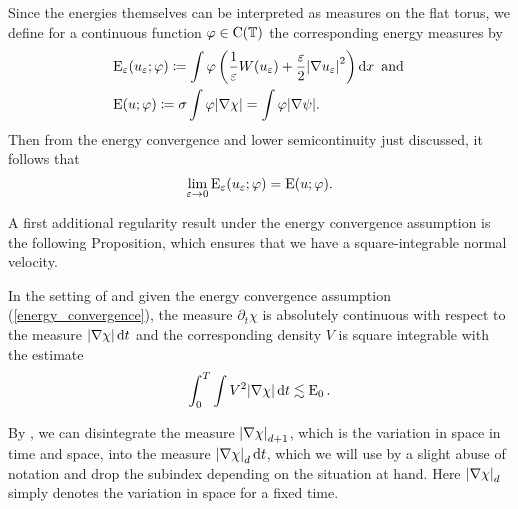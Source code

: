 Since the energies themselves can be interpreted as measures on the flat torus, 
we define for a continuous function $ \varphi \in \operatorname{C} ( \operatorname{\mathbb{T}} ) $ the 
corresponding energy measures by
\begin{align*}
	& \operatorname{E}_{ \varepsilon } ( u_{ \varepsilon} ; \varphi )
	\coloneqq
	\int
	\varphi
	\left(
	\frac{ 1 }{ \varepsilon }
	W ( u_{ \varepsilon } )
	+
	\frac{ \varepsilon }{ 2 }
	\abs{ \nabla u_{ \varepsilon } }^{ 2 }
	\right)
	\dd{x } 
	\text{ and }
	\\
	& \operatorname{E} ( u ; \varphi )
	\coloneqq
	\sigma
	\int
	\varphi
	\abs{ \nabla \chi }
	=
	\int
		\varphi
	\abs{ \nabla \psi }.
\end{align*}
Then from the energy convergence and lower semicontinuity just discussed, it 
follows that 
\begin{equation}
	\label{convergence_of_energy_measures}
	\lim_{ \varepsilon \to 0 }
	\operatorname{E}_{ \varepsilon } ( u_{ \varepsilon } ; \varphi )
	=
	\operatorname{E} ( u ; \varphi ).
\end{equation}

A first additional regularity result under the energy convergence assumption is 
the following Proposition, which ensures that we have a square-integrable 
normal velocity.

\begin{proposition}
	\label{existence_of_velocity_twophase}
	In the setting of  and given the energy 
	convergence assumption (\ref{energy_convergence}), the measure $ \partial_{ 
	t } \chi $ is absolutely continuous with respect to the measure $ \abs{ 
	\nabla \chi } \dd{ t } $ and the corresponding density $ V $ is square 
	integrable with the estimate
	\begin{equation*}
		\int_{ 0 }^{ T }
		\int
		V^{ 2 }
		\abs{ \nabla \chi }
		\dd{ t }
		\lesssim
		\operatorname{E}_{ 0 }.
	\end{equation*}
\end{proposition}

\begin{remark}
	By 
	\cite[Thm.~3.103]{ambrosio_fusco_pallara_functions_of_bv_and_free_discontinuity_problems},
	 we can disintegrate the measure $ \abs{ \nabla \chi }_{ d + 1 } $, which 
	is the variation in space in time and space, into the measure $ \abs{ 
	\nabla \chi }_{ d } \dd{ t } $, which we will use by a slight abuse of 
	notation and drop the subindex depending on the situation at hand. Here $ 
	\abs{ \nabla \chi }_{ d } $ simply denotes the variation in space for a 
	fixed time.
\end{remark}

